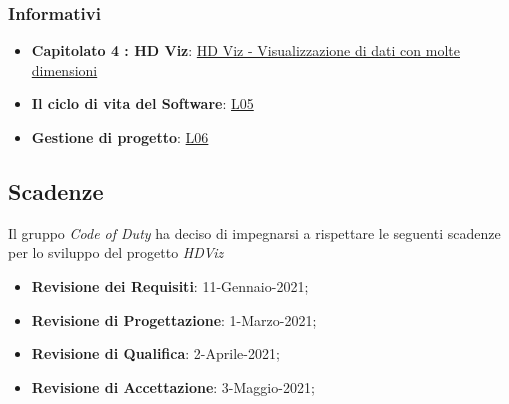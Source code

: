 	\subsubsection{Informativi}
		\begin{itemize}
			\item \textbf{Capitolato 4 : HD Viz}: \href{https://www.math.unipd.it/~tullio/IS-1/2020/Progetto/C4.pdf}{HD Viz - Visualizzazione di dati con molte dimensioni}
			\item \textbf{Il ciclo di vita del Software}: \href{https://www.math.unipd.it/~tullio/IS-1/2020/Dispense/L05.pdf}{L05}
			\item \textbf{Gestione di progetto}: \href{https://www.math.unipd.it/~tullio/IS-1/2020/Dispense/L06.pdf}{L06}
		\end{itemize}
\subsection{Scadenze}
	Il gruppo \emph{Code of Duty} ha deciso di impegnarsi a rispettare le seguenti scadenze per lo sviluppo del progetto \emph{HDViz}
	\begin{itemize}
		\item \textbf{Revisione dei Requisiti}: 11-Gennaio-2021;
		\item \textbf{Revisione di Progettazione}: 1-Marzo-2021;
		\item \textbf{Revisione di Qualifica}: 2-Aprile-2021;
		\item \textbf{Revisione di Accettazione}: 3-Maggio-2021;
	\end{itemize}
